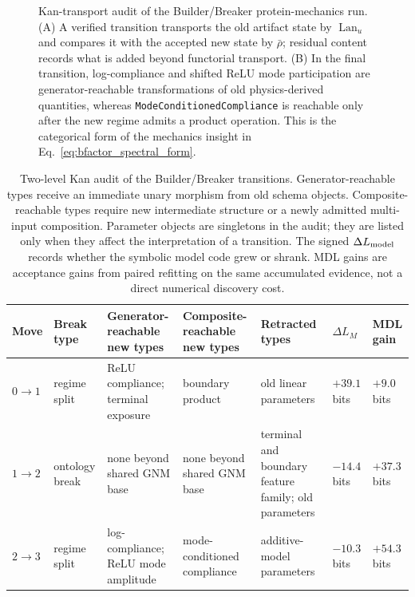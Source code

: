 \documentclass[11pt]{article}
\theoremstyle{definition}
\newcommand{\Lan}{\operatorname{Lan}}
\begin{document}
\begin{figure}[t]
{\begin{tikzpicture}
\end{tikzpicture}%
}
\caption{Kan-transport audit of the Builder/Breaker protein-mechanics run. (A) A verified transition transports the old artifact state by $\Lan_u$ and compares it with the accepted new state by $\bar\rho$; residual content records what is added beyond functorial transport. (B) In the final transition, log-compliance and shifted ReLU mode participation are generator-reachable transformations of old physics-derived quantities, whereas \texttt{ModeConditionedCompliance} is reachable only after the new regime admits a product operation. This is the categorical form of the mechanics insight in Eq.~\ref{eq:bfactor_spectral_form}.}
\label{fig:kan_audit_builder_breaker}
\end{figure}

\begin{table}[t]
\centering
\footnotesize
\setlength{\tabcolsep}{3.5pt}
\begin{tabular}{>{\raggedright\arraybackslash}p{0.75cm}
                >{\raggedright\arraybackslash}p{1.4cm}
                >{\raggedright\arraybackslash}p{2.65cm}
                >{\raggedright\arraybackslash}p{2.45cm}
                >{\raggedright\arraybackslash}p{2.1cm}
                >{\raggedright\arraybackslash}p{1.0cm}
                >{\raggedright\arraybackslash}p{1.0cm}}
\toprule
Move & Break type & Generator-reachable new types & Composite-reachable new types & Retracted types & $\Delta L_M$ & MDL gain \\
\midrule
$0\to1$ & regime split & ReLU compliance; terminal exposure & boundary product & old linear parameters & $+39.1$ bits & $+9.0$ bits \\
$1\to2$ & ontology break & none beyond shared GNM base & none beyond shared GNM base & terminal and boundary feature family; old parameters & $-14.4$ bits & $+37.3$ bits \\
$2\to3$ & regime split & log-compliance; ReLU mode amplitude & mode-conditioned compliance & additive-model parameters & $-10.3$ bits & $+54.3$ bits \\
\bottomrule
\end{tabular}
\caption{Two-level Kan audit of the Builder/Breaker transitions. Generator-reachable types receive an immediate unary morphism from old schema objects. Composite-reachable types require new intermediate structure or a newly admitted multi-input composition. Parameter objects are singletons in the audit; they are listed only when they affect the interpretation of a transition. The signed $\Delta L_{\rm model}$ records whether the symbolic model code grew or shrank. MDL gains are acceptance gains from paired refitting on the same accumulated evidence, not a direct numerical discovery cost.}
\label{tab:kan_audit}
\end{table}
\end{document}
